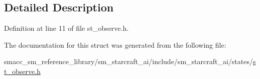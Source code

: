 \subsection{Detailed Description}


Definition at line 11 of file st\+\_\+observe.\+h.



The documentation for this struct was generated from the following file\+:\begin{DoxyCompactItemize}
\item 
smacc\+\_\+sm\+\_\+reference\+\_\+library/sm\+\_\+starcraft\+\_\+ai/include/sm\+\_\+starcraft\+\_\+ai/states/\hyperlink{st__observe_8h}{st\+\_\+observe.\+h}\end{DoxyCompactItemize}
